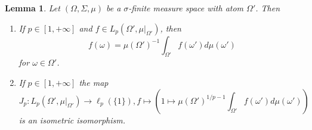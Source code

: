 \documentclass[12pt]{article}
\newtheorem{lemma}[theorem]{Lemma}
\begin{document}
\begin{lemma}\label{FuncDescOnAtom} Let $(\Omega,\Sigma,\mu)$ be a
    $\sigma$-finite measure space with atom $\Omega'$. Then
    \begin{enumerate}[label = (\roman*)]
        \item If $p\in[1,+\infty]$ and $f\in L_p(\Omega',\mu|_{\Omega'})$, then
              $$
                  f(\omega)
                  ={\mu(\Omega')}^{-1}\int_{\Omega'} f(\omega')d\mu(\omega')
              $$
              for $\omega\in\Omega'$.

        \item If $p\in[1,+\infty]$ the map
              $$
                  J_p:L_p(\Omega',\mu|_{\Omega'})\to \ell_p( \{1 \}),
                  f\mapsto\left(1\mapsto {\mu(\Omega')}^{1/p-1}\int_{\Omega'}
                  f(\omega')d\mu(\omega')\right)
              $$
              is an isometric isomorphism.
    \end{enumerate}

\end{lemma}
\end{document}
